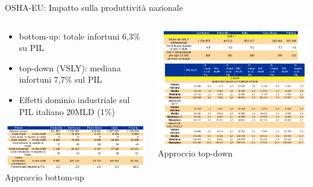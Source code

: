 \documentclass{beamer}
\begin{document}
\begin{frame}{OSHA-EU: Impatto sulla produttività nazionale}

  \begin{columns}  
    \begin{column}{0.5\textwidth}
      \begin{itemize}
	\item bottom-up: totale infortuni 6,3\% su PIL
	\item top-down (VSLY): mediana infortuni 7,7\% sul PIL	
	\item Effetti dominio industriale sul PIL italiano 20MLD (1\%)
  \end{itemize}
      \centering
      \includegraphics[width=\textwidth]{images/onere_infortuni_ba.png}
      \vspace{2mm}
      \small{Approccio bottom-up}
    \end{column}

    \begin{column}{0.5\textwidth}
      \centering
      \includegraphics[width=\textwidth]{images/onere_infortuni_td.png}
      \vspace{2mm}
      \small{Approccio top-down}
    \end{column}
  \end{columns}
\end{frame}
\end{document}
